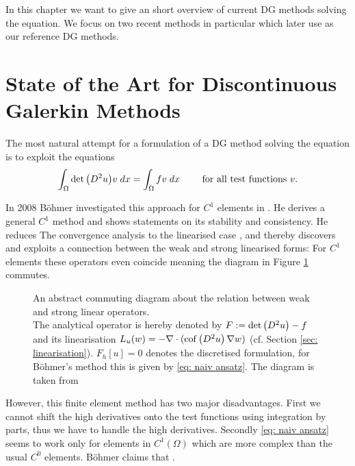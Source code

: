 In this chapter we want to give an short overview of current DG methods solving the \MA equation. We focus on two recent methods \cite{BGN+2011, Neilan2014} in particular which later use as our reference DG methods.

\section{State of the Art for Discontinuous Galerkin Methods} %

The most natural attempt for a formulation of a DG method solving the \MA equation is to exploit the equations
\begin{align}
	\int_{\Omega} {{\det{\left(D^2 u\right)} v}\;dx} = \int_{\Omega} {{fv}\;dx} \qquad \text{ for all test functions } v. \label{eq: naiv ansatz}
\end{align}

In 2008 B\"ohmer investigated this approach for $C^1$ elements in \cite{Boehmer2008}. He derives a general $C^1$ method and shows statements on its stability and consistency. 
He reduces The convergence analysis to the linearised case \cite[Section 9]{Boehmer2008}, and thereby discovers and exploits a connection between the weak and strong linearised forms: For $C^1$ elements these operators even coincide meaning the diagram in Figure \ref{fig: fe diagram} commutes.
\begin{figure}[H]
	
	\caption{An abstract commuting diagram about the relation between weak and strong linear operators.\\ The analytical \MA operator is hereby denoted by $F:=\det{\left(D^2 u\right)} -f $ and its linearisation $L_u(w) = -\nabla \cdot (\operatorname{cof} \left( D^2 u \right) \nabla w)$ (cf. Section \ref{sec: linearisation}). $F_h[u]=0$ denotes the discretised formulation, for B\"ohmer's method this is given by \eqref{eq: naiv ansatz}. The diagram is taken from \cite[Fig 2.2]{FGN2013}}
	\label{fig: fe diagram}	
\end{figure}
However, this finite element method has two major disadvantages. 
First we cannot shift the high derivatives onto the test functions using integration by parts, thus we have to handle the high derivatives. Secondly \eqref{eq: naiv ansatz} seems to work only for elements in $C^1(\Omega)$ which are more complex than the usual $C^0$ elements. B\"ohmer claims that \cite[p. 1214]{Boehmer2008}.

